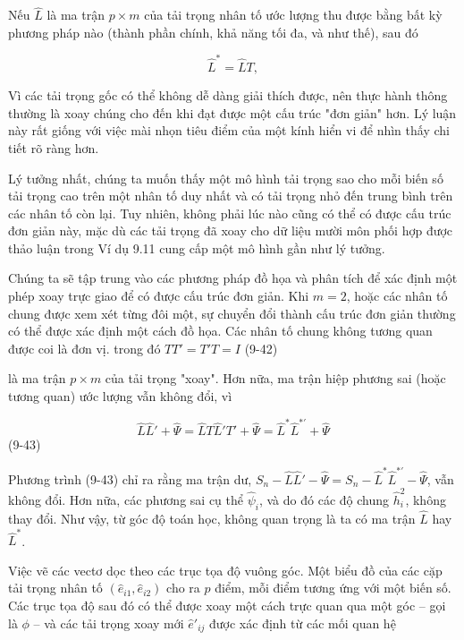 \documentclass{article}
\begin{document}
Nếu $\hat{L}$ là ma trận $p \times m$ của tải trọng nhân tố ước lượng thu được bằng bất kỳ phương pháp nào (thành phần chính, khả năng tối đa, và như thế), sau đó

\begin{equation}
\hat{L}^* = \hat{L}T,
\end{equation}

Vì các tải trọng gốc có thể không dễ dàng giải thích được, nên thực hành thông thường là xoay chúng cho đến khi đạt được một cấu trúc "đơn giản" hơn. Lý luận này rất giống với việc mài nhọn tiêu điểm của một kính hiển vi để nhìn thấy chi tiết rõ ràng hơn.

Lý tưởng nhất, chúng ta muốn thấy một mô hình tải trọng sao cho mỗi biến số tải trọng cao trên một nhân tố duy nhất và có tải trọng nhỏ đến trung bình trên các nhân tố còn lại. Tuy nhiên, không phải lúc nào cũng có thể có được cấu trúc đơn giản này, mặc dù các tải trọng đã xoay cho dữ liệu mười môn phối hợp được thảo luận trong Ví dụ 9.11 cung cấp một mô hình gần như lý tưởng.

Chúng ta sẽ tập trung vào các phương pháp đồ họa và phân tích để xác định một phép xoay trực giao để có được cấu trúc đơn giản. Khi \( m = 2 \), hoặc các nhân tố chung được xem xét từng đôi một, sự chuyển đổi thành cấu trúc đơn giản thường có thể được xác định một cách đồ họa. Các nhân tố chung không tương quan được coi là đơn vị.
trong đó $TT' = T'T = I$ (9-42)

là ma trận $p \times m$ của tải trọng "xoay". Hơn nữa, ma trận hiệp phương sai (hoặc tương quan) ước lượng vẫn không đổi, vì

\begin{equation}
\hat{L}\hat{L}' + \hat{\Psi} = \hat{L}T\hat{L}'T' + \hat{\Psi} = \hat{L}^*\hat{L}^{*'} + \hat{\Psi}
\end{equation}
(9-43)

Phương trình (9-43) chỉ ra rằng ma trận dư, $S_n - \hat{L}\hat{L}' - \hat{\Psi} = S_n - \hat{L}^*\hat{L}^{*'} - \hat{\Psi}$, vẫn không đổi. Hơn nữa, các phương sai cụ thể $\hat{\psi}_i$, và do đó các độ chung $\hat{h}_i^2$, không thay đổi. Như vậy, từ góc độ toán học, không quan trọng là ta có ma trận $\hat{L}$ hay $\hat{L}^*$.

Việc vẽ các vectơ dọc theo các trục tọa độ vuông góc. Một biểu đồ của các cặp tải trọng nhân tố \((\hat{e}_{i1}, \hat{e}_{i2})\) cho ra \(p\) điểm, mỗi điểm tương ứng với một biến số. Các trục tọa độ sau đó có thể được xoay một cách trực quan qua một góc -- gọi là \(\phi\) -- và các tải trọng xoay mới \(\hat{e}'_{ij}\) được xác định từ các mối quan hệ
\end{document}
